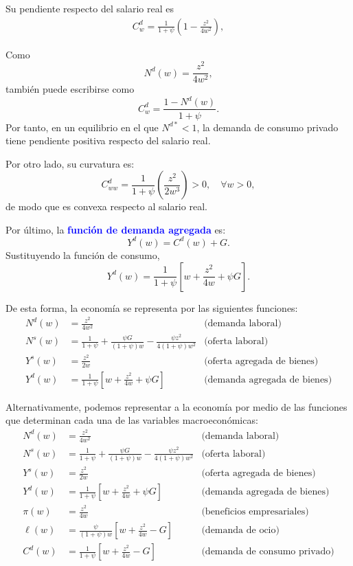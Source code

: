\documentclass[11pt]{article}
\begin{document}
Su pendiente respecto del salario real es
\begin{align*}
C^d_w
=
\frac{1}{1+\psi}
\left(
1-\frac{z^2}{4w^2}
\right),
\end{align*}

Como
\[
N^d(w)=\frac{z^2}{4w^2},
\]
también puede escribirse como
\[
C^d_w
=
\frac{1-N^d(w)}{1+\psi}.
\]
Por tanto, en un equilibrio en el que \(N^{d*}<1\), la demanda de consumo privado tiene pendiente positiva respecto del salario real.

Por otro lado, su curvatura es:
$$
C^d_{ww} = \frac{1}{1+\psi}
\left(
\frac{z^2}{2w^3}
\right) > 0, \quad  \forall w>0,
$$
de modo que es convexa respecto al salario real.

Por último, la \textcolor{blue}{\textbf{función de demanda agregada}} es:
\[
Y^d(w)=C^d(w)+G.
\]
Sustituyendo la función de consumo,
\begin{equation}
\boxed{Y^d(w)
=
\frac{1}{1+\psi}
\left[w+\dfrac{z^2}{4w}+\psi G \right]
}.
\end{equation}

De esta forma, la economía se representa por las siguientes funciones:
\begin{equation}
  \boxed{
    \begin{aligned}
      N^d(w) &= \frac{z^2}{4w^2}
        & \text{(demanda laboral)} \\[2mm]
      N^s(w) &= \frac{1}{1+\psi}+\frac{\psi G}{(1+\psi)w}-\frac{\psi z^2}{4(1+\psi)w^2}
        & \text{(oferta laboral)} \\[2mm]
      Y^s(w) &= \frac{z^2}{2w}
        & \text{(oferta agregada de bienes)} \\[2mm]
      Y^d(w) &= \frac{1}{1+\psi}\left[w+\frac{z^2}{4w}+\psi G\right]
        & \text{(demanda agregada de bienes)}
    \end{aligned}
  }
\end{equation}

Alternativamente, podemos representar a la economía por medio de las funciones que determinan cada una de las variables macroeconómicas:
\begin{equation}
  \boxed{
    \begin{aligned}
      N^d(w) &= \frac{z^2}{4w^2}
        & \text{(demanda laboral)} \\[2mm]
      N^s(w) &= \frac{1}{1+\psi}+\frac{\psi G}{(1+\psi)w}-\frac{\psi z^2}{4(1+\psi)w^2}
        & \text{(oferta laboral)} \\[2mm]
      Y^s(w) &= \frac{z^2}{2w}
        & \text{(oferta agregada de bienes)} \\[2mm]
      Y^d(w) &= \frac{1}{1+\psi}\left[w+\frac{z^2}{4w}+\psi G\right]
        & \text{(demanda agregada de bienes)} \\[2mm]
      \pi(w) &= \frac{z^2}{4w}
        & \text{(beneficios empresariales)} \\[2mm]
      \ell(w) &= \frac{\psi}{(1+\psi)w}\left[w+\frac{z^2}{4w}-G\right]
        & \text{(demanda de ocio)} \\[2mm]
      C^d(w) &= \frac{1}{1+\psi}\left[w+\frac{z^2}{4w}-G\right]
        & \text{(demanda de consumo privado)}
    \end{aligned}
  }
\end{equation}
\end{document}
